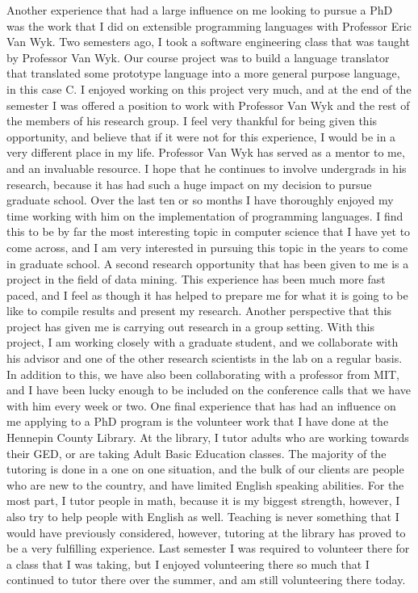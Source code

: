 \documentclass[a4paper,12pt]{article}
\newcommand{\tab}{\hspace*{2em}}
\begin{document}
\tab Another experience that had a large influence on me looking to pursue a PhD was the work that I did on extensible programming languages with Professor Eric Van Wyk.  Two semesters ago, I took a software engineering class that was taught by Professor Van Wyk.  Our course project was to build a language translator that translated some prototype language into a more general purpose language, in this case C.  I enjoyed working on this project very much, and at the end of the semester I was offered a position to work with Professor Van Wyk and the rest of the members of his research group.  I feel very thankful for being given this opportunity, and believe that if it were not for this experience, I would be in a very different place in my life.  Professor Van Wyk has served as a mentor to me, and an invaluable resource.   I hope that he continues to involve undergrads in his research, because it has had such a huge impact on my decision to pursue graduate school.    Over the last ten or so months I have thoroughly enjoyed my time working with him on the implementation of programming languages.  I find this to be by far the most interesting topic in computer science that I have yet to come across, and I am very interested in pursuing this topic in the years to come in graduate school.\newline
\tab A second research opportunity that has been given to me is a project in the field of data mining.  This experience has been much more fast paced, and I feel as though it has helped to prepare me for what it is going to be like to compile results and present my research.  Another perspective that this project has given me is carrying out research in a group setting.  With this project, I am working closely with a graduate student, and we collaborate with his advisor and one of the other research scientists in the lab on a regular basis.  In addition to this, we have also been collaborating with a professor from MIT, and I have been lucky enough to be included on the conference calls that we have with him every week or two.\newline
\tab One final experience that has had an influence on me applying to a PhD program is the volunteer work that I have done at the Hennepin County Library.  At the library, I tutor adults who are working towards their GED, or are taking Adult Basic Education classes.  The majority of the tutoring is done in a one on one situation, and the bulk of our clients are people who are new to the country, and have limited English speaking abilities.  For the most part, I tutor people in math, because it is my biggest strength, however, I also try to help people with English as well.  Teaching is never something that I would have previously considered, however, tutoring at the library has proved to be a very fulfilling experience.  Last semester I was required to volunteer there for a class that I was taking, but I enjoyed volunteering there so much that I continued to tutor there over the summer, and am still volunteering there today.  \newline
\end{document}

